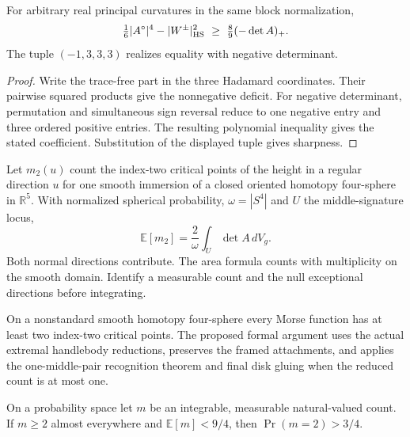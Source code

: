 \begin{lemma}
\label{lem:routes-shape-deficit}
\leanok
For arbitrary real principal curvatures in the same block normalization,
\[
  \tfrac16 |A^\circ|^4-|W^\pm|_{\rm HS}^2
     \ \ge\ \tfrac89(-\det A)_+ .
\]
The tuple \((-1,3,3,3)\) realizes equality with negative determinant.
\end{lemma}

\begin{proof}
\leanok
Write the trace-free part in the three Hadamard coordinates. Their
pairwise squared products give the nonnegative deficit. For negative
determinant, permutation and simultaneous sign reversal reduce to one
negative entry and three ordered positive entries. The resulting
polynomial inequality gives the stated coefficient. Substitution of the
displayed tuple gives sharpness.
\end{proof}

\begin{lemma}
\label{lem:routes-indexed-mass}
Let \(m_2(u)\) count the index-two critical points of the height in a
regular direction \(u\) for one smooth immersion of a closed oriented
homotopy four-sphere in \(\mathbb R^5\). With normalized spherical
probability, \(\omega=|S^4|\) and \(U\) the middle-signature locus,
\[
  \mathbb E[m_2]=\frac{2}{\omega}\int_U\det A\,dV_g .
\]
Both normal directions contribute. The area formula counts with
multiplicity on the smooth domain. Identify a measurable count and the
null exceptional directions before integrating.
\end{lemma}

\begin{proposition}
\label{prop:routes-middle-count}
On a nonstandard smooth homotopy four-sphere every Morse function has at
least two index-two critical points. The proposed formal argument uses
the actual extremal handlebody reductions, preserves the framed
attachments, and applies the one-middle-pair recognition theorem and
final disk gluing when the reduced count is at most one.
\end{proposition}

\begin{lemma}
\label{lem:routes-height-selection}
\leanok
On a probability space let \(m\) be an integrable, measurable
natural-valued count. If \(m\ge2\) almost everywhere and
\(\mathbb E[m]<9/4\), then \(\Pr(m=2)>3/4\).
\end{lemma}


